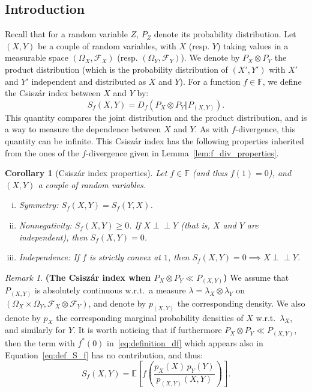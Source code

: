 \documentclass[12pt]{article}
\newcommand{\cf}{{\mathcal F}}
\newcommand{\E}{{\mathbb E}}
\newcommand{\F}{{\mathbb F}}
\newcommand{\indep}{\mathrel{\perp \!\!\! \perp}}
\theoremstyle{plain}
\newtheorem{cor}[theo]{Corollary}
\theoremstyle{remark}
\newtheorem{rem}{Remark}
\begin{document}
\subsection{Introduction}
Recall that for a random variable $Z$, $P_Z$ denote its  probability distribution. 
Let  $(X,Y)$ be a couple of random variables, with $X$ (resp. $Y$) taking values in a measurable space $(\Omega_X, \cf_X)$ (resp. $(\Omega_Y, \cf_Y)$).
We  denote  by $P_X \otimes P_Y$ the product distribution (which is the probability distribution of $(X',Y')$ with $X'$ and $Y'$ independent and distributed as $X$ and $Y$). For a function $f \in \F$, we define the Csisz\'ar index between $X$ and $Y$ by:
\begin{equation}
\label{eq:def_S_f}
    S_f(X,Y) = D_f(P_X \otimes P_Y \Vert P_{(X,Y)}).
\end{equation}
This  quantity   compares  the  joint  distribution and the  product
distribution, and  is a way  to measure  the dependence between  $X$ and
$Y$.  As  with  $f$-divergence,  this quantity  can  be  infinite.  This
Csisz\'ar index has the following  properties inherited from the ones of
the $f$-divergence given in Lemma~\ref{lem:f_div_properties}.
\begin{cor}[Csisz\'ar index properties]
\label{cor:Csiszar_index_properties}
    Let $f \in \F$ (and thus $f(1)=0$), and $(X,Y)$ a couple of random variables.
    \begin{enumerate}[(i)]
    \item \label{enum:S_index_prop_symmetry} Symmetry: $S_f(X,Y) = S_f(Y,X)$.
    \item \label{enum:S_index_prop_nonnegativity} Nonnegativity: $S_f(X,Y) \geq 0$. If $X \indep Y$ (that is, $X$ and $Y$ are independent), then $S_f(X,Y) = 0$.
    \item \label{enum:S_index_prop_independent} Independence: If $f$ is strictly convex at $1$, then $S_f(X,Y) = 0 \implies X \indep Y$.
\end{enumerate}
\end{cor}



\begin{rem}{\bf (The Csisz\'ar index when $P_X \otimes P_Y \ll P_{(X,Y)}$)} 
We assume   that $P_{(X,Y)}$ is absolutely continuous w.r.t.\ a measure $\lambda=\lambda_X
        \otimes \lambda_Y$ on $(\Omega_X \times \Omega_Y, \cf_X\otimes
        \cf_Y)$, and  denote by $p_{(X,Y)}$ the corresponding
        density. We also denote by $p_X$  the corresponding
        marginal probability densities of $X$  w.r.t.\
        $\lambda_X$, and similarly for $Y$.
It is worth noticing that if furthermore 
 $P_X \otimes P_Y \ll P_{(X,Y)}$, 
 then the term  with $f^*(0)$ in~\eqref{eq:definition_df} which appears also in 
  Equation~\eqref{eq:def_S_f} has no contribution, and thus: 
 \begin{equation}
        S_f(X,Y) = \E \left[ f\left(\frac{p_X(X)\, p_Y(Y)}{p_{(X,Y)}(X,Y)} \right) \right].
      \end{equation}
\end{rem}
\end{document}

